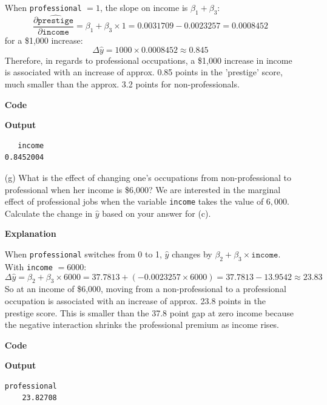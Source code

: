 \documentclass[12pt,letterpaper]{article}
\begin{document}
\begin{enumerate}
	When \texttt{professional} $= 1$, the slope on income is $\beta_1 + \beta_3$:
	\[
	\frac{\partial \widehat{\texttt{prestige}}}{\partial \texttt{income}} = \beta_1 + \beta_3 \times 1 = 0.0031709 - 0.0023257 = 0.0008452
	\]
	for a \$1,000 increase:
	\[
	\Delta \hat{y} = 1000 \times 0.0008452 \approx 0.845
	\]
	Therefore, in regards to professional occupations, a \$1,000 increase in income is associated with an increase of approx. 0.85 points in the 'prestige' score, much smaller than the approx. 3.2 points for non-professionals.
	\vspace{1cm}

	\textbf{Code}
	
	\vspace{.5cm}
	\textbf{Output}
	\begin{verbatim}
   income
0.8452004
	\end{verbatim}

	\vspace{10cm}
	
	
	\item [(g)]
	What is the effect of changing one's occupations from non-professional to professional when her income is \$6,000? We are interested in the marginal effect of professional jobs when the variable \texttt{income} takes the value of $6,000$. Calculate the change in $\hat{y}$ based on your answer for (c).
	\vspace{.5cm}

	\textbf{Explanation}
	\vspace{.5cm}

	When \texttt{professional} switches from 0 to 1, $\hat{y}$ changes by $\beta_2 + \beta_3 \times \texttt{income}$. With \texttt{income} $= 6000$:
	\[
	\Delta \hat{y} = \beta_2 + \beta_3 \times 6000 = 37.7813 + (-0.0023257 \times 6000) = 37.7813 - 13.9542 \approx 23.83
	\]
	So at an income of \$6,000, moving from a non-professional to a professional occupation is associated with an increase of approx. 23.8 points in the prestige score. This is smaller than the 37.8 point gap at zero income because the negative interaction shrinks the professional premium as income rises.
	\vspace{1cm}

	\textbf{Code}
	
	\vspace{.5cm}
	\textbf{Output}
	\begin{verbatim}
professional
    23.82708
	\end{verbatim}


	
\end{enumerate}
\end{document}

